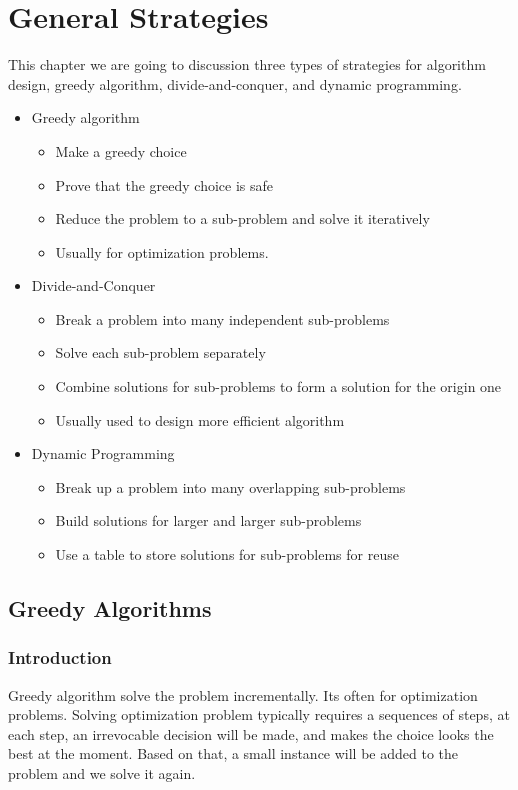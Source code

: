 	\chapter{General Strategies}
		This chapter we are going to discussion three types of strategies for algorithm design, greedy algorithm, divide-and-conquer, and dynamic programming.
		\begin{itemize}
			\item Greedy algorithm
			\begin{itemize}
				\item Make a greedy choice
				\item Prove that the greedy choice is safe
				\item Reduce the problem to a sub-problem and solve it iteratively
				\item Usually for optimization problems.
			\end{itemize}
			\item Divide-and-Conquer
			\begin{itemize}
				\item Break a problem into many independent sub-problems
				\item Solve each sub-problem separately
				\item Combine solutions for sub-problems to form a solution for the origin one
				\item Usually used to design more efficient algorithm
			\end{itemize}
			\item Dynamic Programming
			\begin{itemize}
				\item Break up a problem into many overlapping sub-problems
				\item Build solutions for larger and larger sub-problems
				\item Use a table to store solutions for sub-problems for reuse
			\end{itemize}
		\end{itemize}

		\section{Greedy Algorithms}
			\subsection{Introduction}
				Greedy algorithm solve the problem incrementally. Its often for optimization problems. Solving optimization problem typically requires a sequences of steps, at each step, an irrevocable decision will be made, and makes the choice looks the best at the moment. Based on that, a small instance will be added to the problem and we solve it again.

